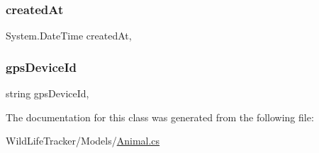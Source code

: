 \subsubsection{\texorpdfstring{created\+At}{createdAt}}
{\footnotesize\ttfamily System.\+Date\+Time created\+At\hspace{0.3cm}{\ttfamily [get]}, {\ttfamily [set]}}

\mbox{\label{classWildLifeTracker_1_1Models_1_1Animal_a073b88a9702ca0513fa534f58a048070}} 
\subsubsection{\texorpdfstring{gps\+Device\+Id}{gpsDeviceId}}
{\footnotesize\ttfamily string gps\+Device\+Id\hspace{0.3cm}{\ttfamily [get]}, {\ttfamily [set]}}



The documentation for this class was generated from the following file\+:\begin{DoxyCompactItemize}
\item 
Wild\+Life\+Tracker/\+Models/\hyperlink{Animal_8cs}{Animal.\+cs}\end{DoxyCompactItemize}
